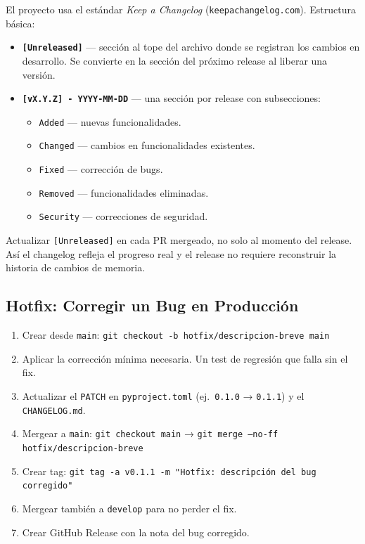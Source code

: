 \documentclass[11pt,a4paper]{article}
\newcommand{\fpath}[1]{\texttt{\small #1}}
\begin{document}
El proyecto usa el estándar \textit{Keep a Changelog} (\texttt{keepachangelog.com}). Estructura básica:

\begin{itemize}[nosep]
  \item \textbf{\fpath{[Unreleased]}} — sección al tope del archivo donde se registran los cambios en desarrollo. Se convierte en la sección del próximo release al liberar una versión.
  \item \textbf{\fpath{[vX.Y.Z] - YYYY-MM-DD}} — una sección por release con subsecciones:
  \begin{itemize}[nosep]
    \item \fpath{Added} — nuevas funcionalidades.
    \item \fpath{Changed} — cambios en funcionalidades existentes.
    \item \fpath{Fixed} — corrección de bugs.
    \item \fpath{Removed} — funcionalidades eliminadas.
    \item \fpath{Security} — correcciones de seguridad.
  \end{itemize}
\end{itemize}

\begin{warnbox}
Actualizar \fpath{[Unreleased]} en cada PR mergeado, no solo al momento del release. Así el changelog refleja el progreso real y el release no requiere reconstruir la historia de cambios de memoria.
\end{warnbox}

\subsection{Hotfix: Corregir un Bug en Producción}

\begin{enumerate}[nosep]
  \item Crear desde \fpath{main}: \fpath{git checkout -b hotfix/descripcion-breve main}
  \item Aplicar la corrección mínima necesaria. Un test de regresión que falla sin el fix.
  \item Actualizar el \fpath{PATCH} en \fpath{pyproject.toml} (ej.\ \fpath{0.1.0} → \fpath{0.1.1}) y el \fpath{CHANGELOG.md}.
  \item Mergear a \fpath{main}: \fpath{git checkout main} → \fpath{git merge --no-ff hotfix/descripcion-breve}
  \item Crear tag: \fpath{git tag -a v0.1.1 -m "Hotfix: descripción del bug corregido"}
  \item Mergear también a \fpath{develop} para no perder el fix.
  \item Crear GitHub Release con la nota del bug corregido.
\end{enumerate}
\end{document}
